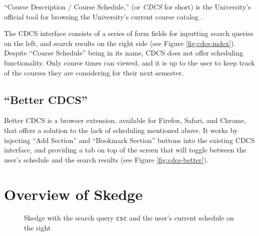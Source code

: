 ``Course Description / Course Schedule,'' (or \emph{CDCS} for short) is the University's official tool for browsing the University's current course catalog \cite{cdcs}.  

The CDCS interface consists of a series of form fields for inputting search queries on the left, and search results on the right side (see Figure \ref{fig:cdcs-index}). Despite ``Course Schedule'' being in its name, CDCS does not offer scheduling functionality. Only course times can viewed, and it is up to the user to keep track of the courses they are considering for their next semester.

\subsection{``Better CDCS''}

Better CDCS \cite{better-cdcs} is a browser extension, available for Firefox, Safari, and Chrome, that offers a solution to the lack of scheduling mentioned above. It works by injecting ``Add Section'' and ``Bookmark Section'' buttons into the existing CDCS interface, and providing a tab on top of the screen that will toggle between the user's schedule and the search results (see Figure \ref{fig:cdcs-better}).


\section{Overview of Skedge}

\begin{figure}[H]
    \centering
    \caption[Skedge with the search query {\tt csc}]{Skedge with the search query {\tt csc} and the user's current schedule on the right}
    \label{fig:sk-index}
\end{figure}

